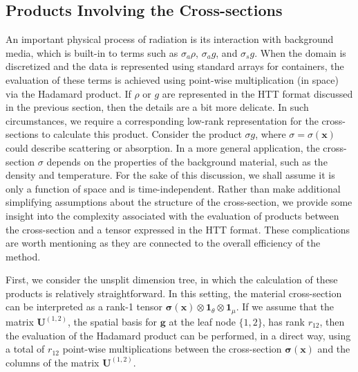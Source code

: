 \documentclass[onefignum,onetabnum]{siamart220329}
\begin{document}
\subsection{Products Involving the Cross-sections}
\label{subsec:cross-sections and hadamard}

An important physical process of radiation is its interaction with background media, which is built-in to terms such as $\sigma_{a} \rho$, $\sigma_{a} g$, and $\sigma_{s} g$. When the domain is discretized and the data is represented using standard arrays for containers, the evaluation of these terms is achieved using point-wise multiplication (in space) via the Hadamard product. If $\rho$ or $g$ are represented in the HTT format discussed in the previous section, then the details are a bit more delicate. In such circumstances, we require a corresponding low-rank representation for the cross-sections to calculate this product. Consider the product $\sigma g$, where $\sigma = \sigma(\mathbf{x})$ could describe scattering or absorption. In a more general application, the cross-section $\sigma$ depends on the properties of the background material, such as the density and temperature. For the sake of this discussion, we shall assume it is only a function of space and is time-independent. Rather than make additional simplifying assumptions about the structure of the cross-section, we provide some insight into the complexity associated with the evaluation of products between the cross-section and a tensor expressed in the HTT format. These complications are worth mentioning as they are connected to the overall efficiency of the method. 

First, we consider the unsplit dimension tree, in which the calculation of these products is relatively straightforward. In this setting, the material cross-section can be interpreted as a rank-1 tensor $\boldsymbol{\sigma} (\mathbf{x}) \otimes \mathbf{1}_{\theta} \otimes \mathbf{1}_{\mu}$. If we assume that the matrix $\mathbf{U}^{(1,2)}$, the spatial basis for $\mathbf{g}$ at the leaf node $\{1,2\}$, has rank $r_{12}$, then the evaluation of the Hadamard product can be performed, in a direct way, using a total of $r_{12}$ point-wise multiplications between the cross-section $\boldsymbol{\sigma} (\mathbf{x})$ and the columns of the matrix $\mathbf{U}^{(1,2)}$.
\end{document}
